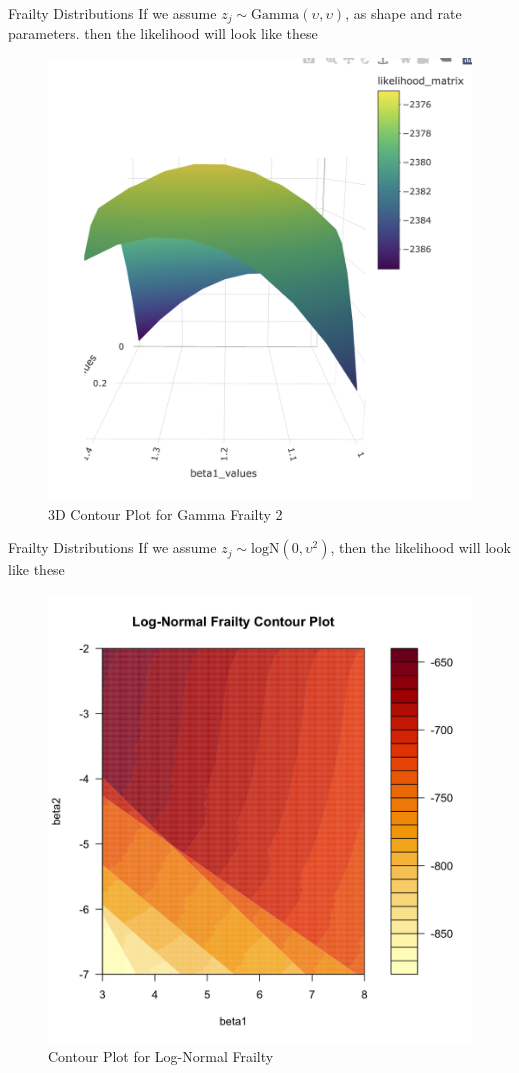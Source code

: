 \documentclass [aspectratio=169]{beamer}
\begin{document}
\begin{frame}{Frailty Distributions}
    If we assume $z_j\sim\text{Gamma}(\upsilon, \upsilon)$, as shape and rate parameters. then the likelihood will look like these
    \begin{figure}[!htb]
        \centering
        \includegraphics[width=0.5\linewidth]{figures/GAMMA 3D 2.png}
        \caption{3D Contour Plot for Gamma Frailty 2}
    \end{figure}
\end{frame}


\begin{frame}{Frailty Distributions}
    If we assume $z_j\sim\text{logN}(0,\upsilon^2)$, then the likelihood will look like these
    \begin{figure}[!htb]
        \centering
        \includegraphics[width=0.5\linewidth]{figures/lognormal frailty contour.png}
        \caption{Contour Plot for Log-Normal Frailty}
    \end{figure}
\end{frame}
\end{document}
